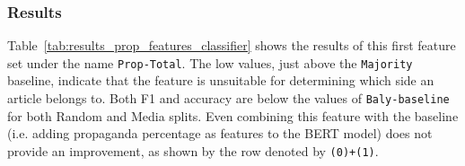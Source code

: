 

\subsubsection{Results}
Table~\ref{tab:results_prop_features_classifier} shows the results of this first feature set under the name \texttt{Prop-Total}. The low values, just above the \texttt{Majority} baseline, indicate that the feature is unsuitable for determining which side an article belongs to. Both F1 and accuracy are below the values of \texttt{Baly-baseline} for both Random and Media splits. Even combining this feature with the baseline (i.e. adding propaganda percentage as features to the BERT model) does not provide an improvement, as shown by the row denoted by \texttt{(0)+(1)}.





